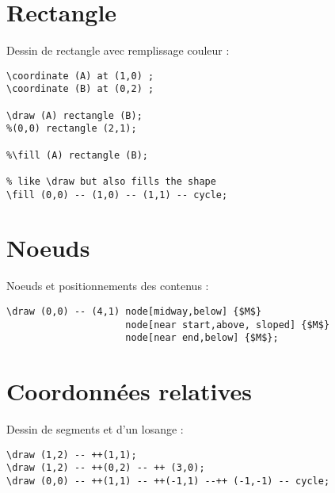 \newpage
\section{Rectangle}
Dessin de rectangle avec remplissage couleur :
\begin{verbatim}
\coordinate (A) at (1,0) ;
\coordinate (B) at (0,2) ;

\draw (A) rectangle (B);
%(0,0) rectangle (2,1);

%\fill (A) rectangle (B);

% like \draw but also fills the shape
\fill (0,0) -- (1,0) -- (1,1) -- cycle;
\end{verbatim}


\newpage
\section{Noeuds}
Noeuds et positionnements des contenus :
\begin{verbatim}
\draw (0,0) -- (4,1) node[midway,below] {$M$}
                     node[near start,above, sloped] {$M$}
                     node[near end,below] {$M$};
\end{verbatim}


\newpage
\section{Coordonnées relatives}
Dessin de segments et d'un losange :
\begin{verbatim}
\draw (1,2) -- ++(1,1);
\draw (1,2) -- ++(0,2) -- ++ (3,0);
\draw (0,0) -- ++(1,1) -- ++(-1,1) --++ (-1,-1) -- cycle;
\end{verbatim}


